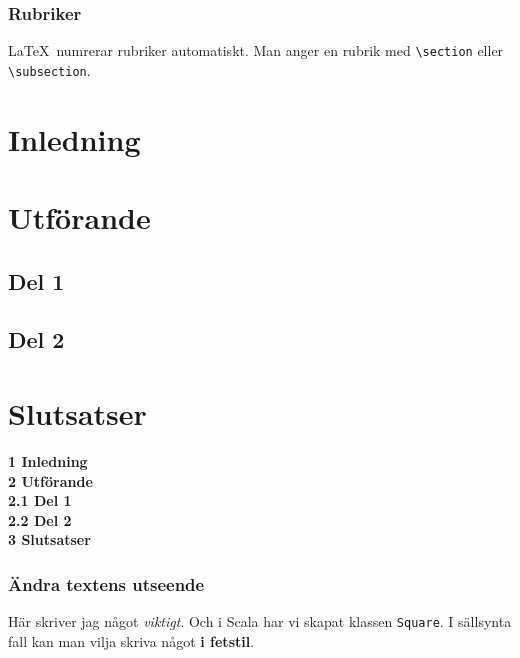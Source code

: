\begin{frame}[fragile,t]
  \frametitle{Rubriker}
  \vspace{2em}
  \LaTeX\ numrerar rubriker automatiskt. Man anger en rubrik med
  \verb+\section+ eller \verb+\subsection+.

  \blankline
  \begin{exsrc}
\section{Inledning}
\section{Utförande}
\subsection{Del 1}
\subsection{Del 2}
\section{Slutsatser}
  \end{exsrc}
  \begin{exresult}
{\Large\bfseries 1 Inledning} \\[1ex]
{\Large\bfseries 2 Utförande} \\[1ex]
{\large\bfseries 2.1 Del 1} \\[1ex]
{\large\bfseries 2.2 Del 2} \\[1ex]
{\Large\bfseries 3 Slutsatser}
  \end{exresult}

\end{frame}

\begin{frame}[fragile,t]
  \frametitle{Ändra textens utseende}
  \vspace{2em}

  \begin{itemize}
  \end{itemize}

  \blankline
  
  \begin{exlatex}
Här skriver jag något \emph{viktigt}.
Och i Scala har vi skapat klassen \texttt{Square}.
I sällsynta fall kan man vilja skriva något \textbf{i fetstil}.
  \end{exlatex}
  
  \blankline
\end{frame}


